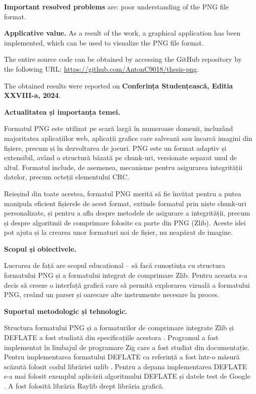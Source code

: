 \documentclass[a4paper,12pt]{report}
\renewcommand{\year}{2024}
\newcommand{\conferencesList}{Conferința Studențească, Editia XXVIII-a, \year}
\begin{document}
\textbf{Important resolved problems} are: poor understanding of the \acs{PNG} file format.

\textbf{Applicative value.} 
As a result of the work, a graphical application has been implemented,
which can be used to visualize the \acs{PNG} file format.

The entire source code can be obtained by accessing the GitHub repository
by the following URL: \url{https://github.com/AntonC9018/thesis-png}. 

The obtained results were reported on \textbf{\conferencesList}\cite{self}.




\textbf{Actualitatea și importanța temei.}

Formatul \ac{PNG} este utilizat pe scară largă în numeroase domenii, incluzând majoritatea aplicațiilor
web, aplicații grafice care salvează sau încarcă imagini din fișiere, precum și în dezvoltarea de jocuri.
\ac{PNG} este un format adaptiv și extensibil, având o structură băzată pe chunk-uri, versionate separat unul
de altul. Formatul include, de asemenea, mecanisme pentru asigurarea integrității datelor, precum
octeții elementului \ac{CRC}.

Reieșind din toate acestea, formatul \ac{PNG} merită să fie învățat pentru a putea manipula eficient fișierele de
acest format, extinde formatul prin niște chunk-uri personalizate, și pentru a afla despre
metodele de asigurare a integrității, precum și despre algoritmii de comprimare folosite ca parte din \ac{PNG}
(Zlib). Aceste idei pot ajuta și la crearea unor formaturi noi de fișier, nu neapărat de imagine.

\textbf{Scopul și obiectivele.}

Lucrarea de față are scopul educațional -- să facă cunoștința cu structura formatului \ac{PNG} și a
formatului integrat de comprimare Zlib.
Pentru aceasta s-a decis să creeze o interfață grafică care
să permită explorarea vizuală a formatului \ac{PNG},
creând un parser și oarecare alte instrumente necesare în proces.


\textbf{Suportul metodologic și tehnologic.}

Structura formatului \ac{PNG} și a formaturilor de comprimare integrate Zlib și DEFLATE
a fost studiată din specificațiile acestora \cite{png_spec} \cite{zlib_spec} \cite{deflate_spec}.
Programul a fost implementat în limbajul de programare Zig \cite{zig} care a fost studiat din documentație.
Pentru implementarea formatului DEFLATE ca referință a fost într-o măsură scăzută folosit codul librăriei uzlib \cite{gzip_impl}.
Pentru a depana implementarea DEFLATE s-a mai folosit exemplul aplicării algoritmului DEFLATE și datele test de Google \cite{deflate_tests}.
A fost folosită librăria Raylib \cite{raylib} drept librăria grafică.
\end{document}

